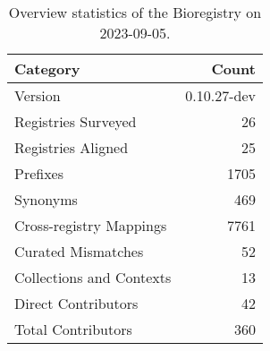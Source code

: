 \begin{table}
\caption{Overview statistics of the Bioregistry on 2023-09-05.}
\label{tab:bioregistry-summary}
\begin{tabular}{lr}
\toprule
Category & Count \\
\midrule
Version & 0.10.27-dev \\
Registries Surveyed & 26 \\
Registries Aligned & 25 \\
Prefixes & 1705 \\
Synonyms & 469 \\
Cross-registry Mappings & 7761 \\
Curated Mismatches & 52 \\
Collections and Contexts & 13 \\
Direct Contributors & 42 \\
Total Contributors & 360 \\
\bottomrule
\end{tabular}
\end{table}

